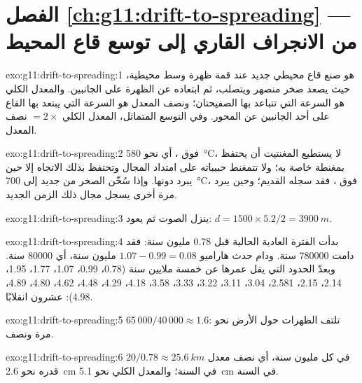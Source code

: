 \section*{الفصل \ref{ch:g11:drift-to-spreading} --- من الانجراف القاري إلى توسع قاع المحيط}

\begin{solution}{exo:g11:drift-to-spreading:1}
 هو صنع قاع محيطي جديد عند قمة ظهرة
وسط محيطية، حيث يصعد صخر منصهر ويتصلب، ثم
ابتعاده عن الظهرة على الجانبين. والمعدل الكلي هو السرعة التي
تتباعد بها الصفيحتان؛ ونصف المعدل هو السرعة التي يبتعد بها القاع على
أحد الجانبين عن المحور. وفي التوسع المتماثل، المعدل الكلي $= 2
\times$ نصف المعدل.
\end{solution}

\begin{solution}{exo:g11:drift-to-spreading:2}
فوق ، أي نحو \qty{580}{\celsius}، لا يستطيع المغنتيت أن يحتفظ
بمغنطة خاصة به؛ ولا تتمغنط حبيباته على امتداد المجال وتحتفظ بذلك الاتجاه
إلا حين يبرد دونها. وإذا سُخّن الصخر من جديد إلى
\qty{700}{\celsius}، فوق ، فقد سجله القديم؛
وحين يبرد مرة أخرى يسجل مجال ذلك الزمن الجديد.
\end{solution}

\begin{solution}{exo:g11:drift-to-spreading:3}
ينزل الصوت ثم يعود: $d = 1500 \times 5.2/2 = \qty{3900}{m}$.
\end{solution}

\begin{solution}{exo:g11:drift-to-spreading:4}
بدأت الفترة العادية الحالية قبل \num{0.78} مليون سنة: فقد دامت
\num{780000} سنة. ودام حدث هاراميو $1.07 - 0.99 = \num{0.08}$
مليون سنة، أي \num{80000} سنة. وبعدّ الحدود التي يقل عمرها عن خمسة
ملايين سنة (0.78، 0.99، 1.07، 1.77، 1.95، 2.14، 2.15، 2.581، 3.04، 3.11،
3.22، 3.33، 3.58، 4.18، 4.29، 4.48، 4.62، 4.80، 4.89، 4.98): عشرون انقلابًا.
\end{solution}

\begin{solution}{exo:g11:drift-to-spreading:5}
$65\,000/40\,000 \approx 1.6$: تلتف الظهرات حول الأرض نحو مرة
ونصف.
\end{solution}

\begin{solution}{exo:g11:drift-to-spreading:6}
$20/0.78 \approx \qty{25.6}{km}$ في كل مليون سنة، أي نصف معدل
قدره نحو \qty{2.6}{cm} في السنة؛ والمعدل الكلي نحو \qty{5.1}{cm} في السنة.
\end{solution}

